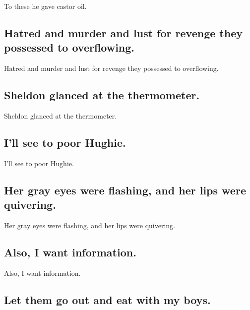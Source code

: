 \documentclass[]{article}
\begin{document}
To these he gave castor oil.

\hypertarget{hatred-and-murder-and-lust-for-revenge-they-possessed-to-overflowing.}{%
\subsection{Hatred and murder and lust for revenge they possessed to
overflowing.}\label{hatred-and-murder-and-lust-for-revenge-they-possessed-to-overflowing.}}

Hatred and murder and lust for revenge they possessed to overflowing.

\hypertarget{sheldon-glanced-at-the-thermometer.}{%
\subsection{Sheldon glanced at the
thermometer.}\label{sheldon-glanced-at-the-thermometer.}}

Sheldon glanced at the thermometer.

\hypertarget{ill-see-to-poor-hughie.}{%
\subsection{I'll see to poor Hughie.}\label{ill-see-to-poor-hughie.}}

I'll see to poor Hughie.

\hypertarget{her-gray-eyes-were-flashing-and-her-lips-were-quivering.}{%
\subsection{Her gray eyes were flashing, and her lips were
quivering.}\label{her-gray-eyes-were-flashing-and-her-lips-were-quivering.}}

Her gray eyes were flashing, and her lips were quivering.

\hypertarget{also-i-want-information.}{%
\subsection{Also, I want information.}\label{also-i-want-information.}}

Also, I want information.

\hypertarget{let-them-go-out-and-eat-with-my-boys.}{%
\subsection{Let them go out and eat with my
boys.}\label{let-them-go-out-and-eat-with-my-boys.}}
\end{document}
